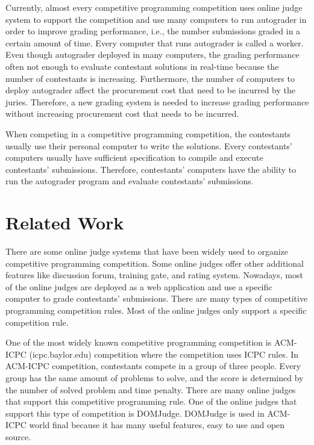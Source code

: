 \documentclass[conference,a4paper]{IEEEtran}
\begin{document}
Currently, almost every competitive programming competition uses online judge system to support the competition and use many computers to run autograder in order to improve grading performance, i.e., the number submissions graded in a certain amount of time. Every computer that runs autograder is called a worker. Even though autograder deployed in many computers, the grading performance often not enough to evaluate contestant solutions in real-time because the number of contestants is increasing. Furthermore, the number of computers to deploy autograder affect the procurement cost that need to be incurred by the juries. Therefore, a new grading system is needed to increase grading performance without increasing procurement cost that needs to be incurred.

When competing in a competitive programming competition, the contestants usually use their personal computer to write the solutions. Every contestants' computers usually have sufficient specification to compile and execute contestants' submissions. Therefore, contestants' computers have the ability to run the autograder program and evaluate contestants' submissions.

\section{Related Work}

There are some online judge systems that have been widely used to organize competitive programming competition. Some online judges offer other additional features like discussion forum, training gate, and rating system. Nowadays, most of the online judges are deployed as a web application and use a specific computer to grade contestants' submissions. There are many types of competitive programming competition rules. Most of the online judges only support a specific competition rule.

One of the most widely known competitive programming competition is ACM-ICPC (icpc.baylor.edu) competition where the competition uses ICPC rules. In ACM-ICPC competition, contestants compete in a group of three people. Every group has the same amount of problems to solve, and the score is determined by the number of solved problem and time penalty. There are many online judges that support this competitive programming rule. One of the online judges that support this type of competition is DOMJudge. DOMJudge is used in ACM-ICPC world final because it has many useful features, easy to use and open source.
\end{document}
